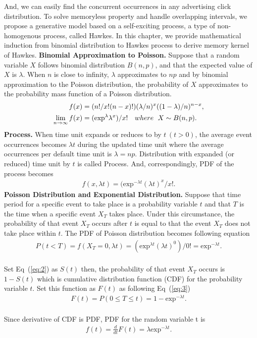 \documentclass[10pt,letterpaper]{article}
\begin{document}
And, we can easily find the concurrent occurrences in any advertising click distribution. To solve memoryless property and handle overlapping intervals, we propose a generative model based on a self-exciting process, a type of non-homogenous process, called Hawkes. In this chapter, we provide mathematical induction from binomial distribution to Hawkes process to derive memory kernel of Hawkes.
\newline
\newline
\textbf{Binomial Approximation to Poisson.	}
Suppose that a random variable $X$ follows binomial distribution $B(n,p)$, and that the expected value of $X$ is $\lambda$. When $n$ is close to infinity, $\lambda$ approximates to $np$ and by binomial approximation to the Poisson distribution, the probability of $X$ approximates to the probability mass function of a Poisson distribution.
\begin{align*}
f(x)&=(n!/x!(n-x)!)(\lambda / n)^{x}((1-\lambda)/n)^{n-x}, \\
\lim_{n\rightarrow \infty }f(x)&=(\text{exp}^{\lambda}\lambda^x)/x! \quad \small where  \ \ X \sim B(n,p).
\end{align*}
\textbf{Process.}
When time unit expands or reduces to by $t\ (t>0)$, the average event occurrences becomes $\lambda t$ during the updated time unit where the average occurrences per default time unit is $\lambda=np$. Distribution with expanded (or reduced) time unit by $t$ is called Process. And, correspondingly, PDF of the process becomes
\begin{align}
\label{eq:1}
f(x, \lambda t)=(\text{exp}^{-\lambda t}(\lambda t)^{x}/x!.
\end{align}   
\textbf{Poisson Distribution and Exponential Distribution.	}
Suppose that time period for a specific event to take place is a probability variable $t$ and that $T$ is the time when a specific event $X_T$ takes place. Under this circumstance, the probability of that event $X_T$ occurs after $t$ is equal to that the event $X_T$ does not take place within $t$. The PDF of Poisson distribution becomes following equation
\begin{align}
\label{eq:2}
P(t<T)=f(X_T=0, \lambda t)= (\text{exp}^{\lambda t} (\lambda t)^0)/0!=\text{exp}^{-\lambda t}.
\end{align}\\   
Set Eq~(\ref{eq:2}) as $S(t)$ then, the probability of that event $X_T$ occurs is $1-S(t)$ which is cumulative distribution function (CDF) for the probability variable $t$. Set this function as $F(t)$ as following Eq~(\ref{eq:3}) 
\begin{align}
\label{eq:3}
F(t)=P(0 \leq T \leq t)=1-\text{exp}^{-\lambda t}.
\end{align} \\   
Since derivative of CDF is PDF, PDF for the random variable t is
\begin{align}
\label{eq:4}
f(t)=\frac{d}{dt}F(t)=\lambda \text{exp}^{-\lambda t}.
\end{align}   
\end{document}
